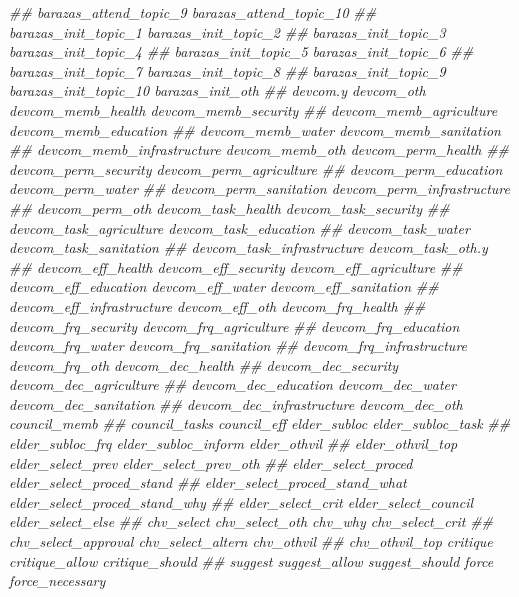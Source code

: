 \documentclass[
]{article}
\newenvironment{Shaded}{\begin{snugshade}}{\end{snugshade}}
\newcommand{\CommentTok}[1]{\textcolor[rgb]{0.56,0.35,0.01}{\textit{#1}}}
\begin{document}
\begin{Shaded}
\begin{Highlighting}[]
\CommentTok{##      barazas_attend_topic_9 barazas_attend_topic_10}
\CommentTok{##      barazas_init_topic_1 barazas_init_topic_2}
\CommentTok{##      barazas_init_topic_3 barazas_init_topic_4}
\CommentTok{##      barazas_init_topic_5 barazas_init_topic_6}
\CommentTok{##      barazas_init_topic_7 barazas_init_topic_8}
\CommentTok{##      barazas_init_topic_9 barazas_init_topic_10 barazas_init_oth}
\CommentTok{##      devcom.y devcom_oth devcom_memb_health devcom_memb_security}
\CommentTok{##      devcom_memb_agriculture devcom_memb_education}
\CommentTok{##      devcom_memb_water devcom_memb_sanitation}
\CommentTok{##      devcom_memb_infrastructure devcom_memb_oth devcom_perm_health}
\CommentTok{##      devcom_perm_security devcom_perm_agriculture}
\CommentTok{##      devcom_perm_education devcom_perm_water}
\CommentTok{##      devcom_perm_sanitation devcom_perm_infrastructure}
\CommentTok{##      devcom_perm_oth devcom_task_health devcom_task_security}
\CommentTok{##      devcom_task_agriculture devcom_task_education}
\CommentTok{##      devcom_task_water devcom_task_sanitation}
\CommentTok{##      devcom_task_infrastructure devcom_task_oth.y}
\CommentTok{##      devcom_eff_health devcom_eff_security devcom_eff_agriculture}
\CommentTok{##      devcom_eff_education devcom_eff_water devcom_eff_sanitation}
\CommentTok{##      devcom_eff_infrastructure devcom_eff_oth devcom_frq_health}
\CommentTok{##      devcom_frq_security devcom_frq_agriculture}
\CommentTok{##      devcom_frq_education devcom_frq_water devcom_frq_sanitation}
\CommentTok{##      devcom_frq_infrastructure devcom_frq_oth devcom_dec_health}
\CommentTok{##      devcom_dec_security devcom_dec_agriculture}
\CommentTok{##      devcom_dec_education devcom_dec_water devcom_dec_sanitation}
\CommentTok{##      devcom_dec_infrastructure devcom_dec_oth council_memb}
\CommentTok{##      council_tasks council_eff elder_subloc elder_subloc_task}
\CommentTok{##      elder_subloc_frq elder_subloc_inform elder_othvil}
\CommentTok{##      elder_othvil_top elder_select_prev elder_select_prev_oth}
\CommentTok{##      elder_select_proced elder_select_proced_stand}
\CommentTok{##      elder_select_proced_stand_what elder_select_proced_stand_why}
\CommentTok{##      elder_select_crit elder_select_council elder_select_else}
\CommentTok{##      chv_select chv_select_oth chv_why chv_select_crit}
\CommentTok{##      chv_select_approval chv_select_altern chv_othvil}
\CommentTok{##      chv_othvil_top critique critique_allow critique_should}
\CommentTok{##      suggest suggest_allow suggest_should force force_necessary}

\end{Highlighting}
\end{Shaded}
\end{document}
